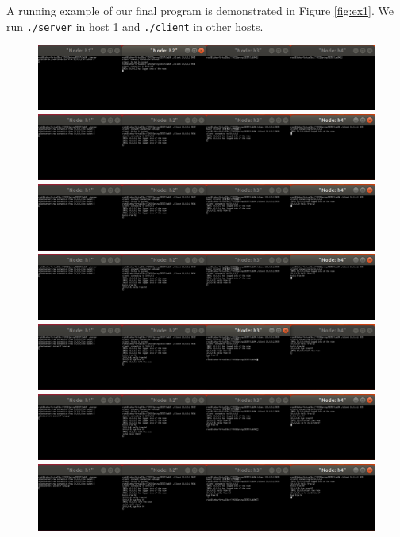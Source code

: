 \begin{exercise}[]
A running example of our final program is demonstrated in Figure \ref{fig:ex1}. We run \texttt{./server} in host 1 and \texttt{./client} in other hosts.


\begin{figure}[hb]
  \begin{center}
  \includegraphics[width=14cm]{img/lab3/chat1.png}
  \includegraphics[width=14cm]{img/lab3/chat2.png}
  \includegraphics[width=14cm]{img/lab3/chat3.png}
  \includegraphics[width=14cm]{img/lab3/chat4.png}
  \includegraphics[width=14cm]{img/lab3/chat5.png}
  \includegraphics[width=14cm]{img/lab3/chat6.png}
  \includegraphics[width=14cm]{img/lab3/chat7.png}

\end{center}
\end{figure}
\end{exercise}
